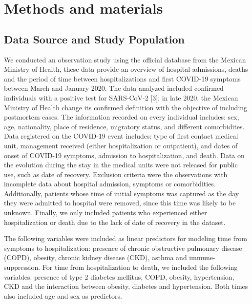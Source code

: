 \documentclass[10pt,letterpaper]{article}
\begin{document}
\hypertarget{methods-and-materials}{%
\section{Methods and materials}\label{methods-and-materials}}

\hypertarget{data-source-and-study-population}{%
\subsection{Data Source and Study
Population}\label{data-source-and-study-population}}

We conducted an observation study using the official database from the
Mexican Ministry of Health, these data provide an overview of hospital
admissions, deaths and the period of time between hospitalizations and
first COVID-19 symptoms between March and January 2020. The data
analyzed included confirmed individuals with a positive test for
SARS-CoV-2 {[}3{]}; in late 2020, the Mexican Ministry of Health change
its confirmed definition with the objective of including postmortem
cases. The information recorded on every individual includes: sex, age,
nationality, place of residence, migratory status, and different
comorbidites. Data registered on the COVID-19 event includes: type of
first contact medical unit, management received (either hospitalization
or outpatient), and dates of onset of COVID-19 symptoms, admission to
hospitalization, and death. Data on the evolution during the stay in the
medical units were not released for public use, such as date of
recovery. Exclusion criteria were the observations with incomplete data
about hospital admission, symptoms or comorbidities. Additionally,
patients whose time of initial symptoms was captured as the day they
were admitted to hospital were removed, since this time was likely to be
unknown. Finally, we only included patients who experienced either
hospitalization or death due to the lack of date of recovery in the
dataset.

The following variables were included as linear predictors for modeling
time from symptoms to hospitalization: presence of chronic obstructive
pulmonary disease (COPD), obesity, chronic kidney disease (CKD), asthma
and immune-suppression. For time from hospitalization to death, we
included the following variables: presence of type 2 diabetes mellitus,
COPD, obesity, hypertension, CKD and the interaction between obesity,
diabetes and hypertension. Both times also included age and sex as
predictors.
\end{document}
